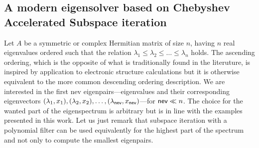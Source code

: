 \subsection{A modern eigensolver based on Chebyshev Accelerated
  Subspace iteration} 
\label{sec-1-4}
Let $A$ be a symmetric or complex Hermitian matrix of size $n$, having $n$
real eigenvalues ordered such that the relation
$\lambda_1\leq \lambda_2\leq \ldots \leq\lambda_n$ holds. The
ascending ordering, which is the opposite of what is traditionally
found in the literuture, is inspired by application to electronic
structure calculations but it is otherwise equivalent to the more
common descending ordering description. We are interested in the first 
{\sf nev} eigenpairs---eigenvalues and their corresponding eigenvectors
$(\lambda_1,x_1),(\lambda_2,x_2),\ldots,(\lambda_{\textsf{nev}},x_{\textsf{nev}})$---for $\textsf{nev}\ll n$.
The choice for the wanted part of the eigenspectrum is arbitrary but
is in line with the examples presented in this work. Let us just
remark that subspace iteration with a polynomial filter can be used
equivalently for the highest part of the spectrum and not only to
compute the smallest eigenpairs.

\newlength{\dlen}  
\newlength{\ylen} \settowidth{\ylen}{$Y$}
\newlength{\clen}

